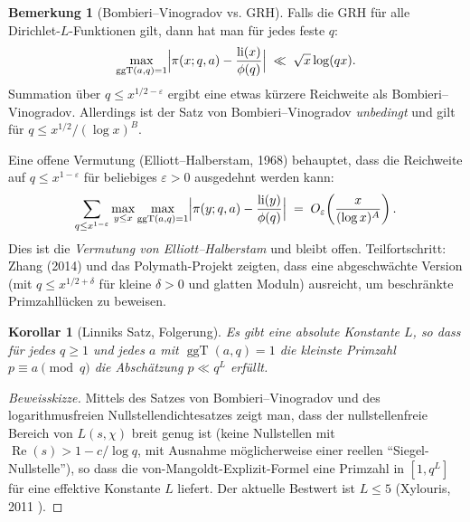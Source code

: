 \documentclass[12pt,a4paper]{amsart}
\newtheorem{korollar}[theorem]{Korollar}
\theoremstyle{definition}
\newtheorem{bemerkung}[theorem]{Bemerkung}
\DeclareMathOperator{\ggT}{ggT}
\DeclareMathOperator{\li}{li}
\begin{document}
\begin{bemerkung}[Bombieri--Vinogradov vs. GRH]
  Falls die GRH für alle Dirichlet-$L$-Funktionen gilt, dann hat man
  für jedes feste $q$:
  \[
    \max_{\ggT(a,q)=1}\Bigl|\pi(x;q,a)-\frac{\li(x)}{\phi(q)}\Bigr|
    \;\ll\;
    \sqrt{x}\log(qx).
  \]
  Summation über $q \leq x^{1/2-\varepsilon}$ ergibt eine etwas kürzere
  Reichweite als Bombieri--Vinogradov.  Allerdings ist der Satz von
  Bombieri--Vinogradov \emph{unbedingt} und gilt für $q \leq x^{1/2}/(\log x)^B$.

  Eine offene Vermutung (Elliott--Halberstam, 1968) behauptet, dass die
  Reichweite auf $q \leq x^{1-\varepsilon}$ für beliebiges $\varepsilon > 0$
  ausgedehnt werden kann:
  \[
    \sum_{q \leq x^{1-\varepsilon}}
    \max_{y \leq x}\max_{\ggT(a,q)=1}
    \Bigl|\pi(y;q,a)-\frac{\li(y)}{\phi(q)}\Bigr|
    \;=\; O_\varepsilon\!\left(\frac{x}{(\log x)^A}\right).
  \]
  Dies ist die \emph{Vermutung von Elliott--Halberstam} und bleibt offen.
  Teilfortschritt: Zhang (2014) und das Polymath-Projekt zeigten, dass eine
  abgeschwächte Version (mit $q \leq x^{1/2+\delta}$ für kleine $\delta > 0$
  und glatten Moduln) ausreicht, um beschränkte Primzahllücken zu beweisen.
\end{bemerkung}

\begin{korollar}[Linniks Satz, Folgerung]\label{kor:linnik}
  Es gibt eine absolute Konstante $L$, so dass für jedes $q \geq 1$ und
  jedes $a$ mit $\ggT(a,q)=1$ die kleinste Primzahl $p \equiv a \pmod q$
  die Abschätzung $p \ll q^L$ erfüllt.
\end{korollar}

\begin{proof}[Beweisskizze]
  Mittels des Satzes von Bombieri--Vinogradov und des logarithmusfreien
  Nullstellendichtesatzes zeigt man, dass der nullstellenfreie Bereich von
  $L(s,\chi)$ breit genug ist (keine Nullstellen mit
  $\operatorname{Re}(s) > 1 - c/\log q$, mit Ausnahme möglicherweise einer
  reellen ``Siegel-Nullstelle''), so dass die von-Mangoldt-Explizit-Formel
  eine Primzahl in $[1, q^L]$ für eine effektive Konstante $L$ liefert.
  Der aktuelle Bestwert ist $L \leq 5$ (Xylouris, 2011 \cite{Xylouris2011}).
\end{proof}
\end{document}
